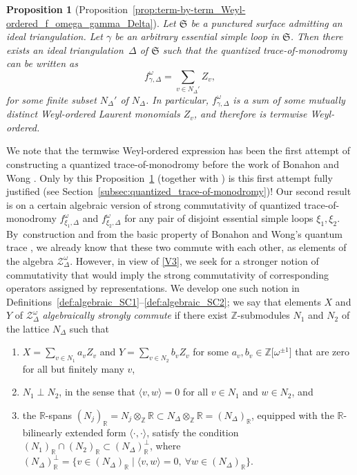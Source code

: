 \documentclass[10pt,a4paper]{amsart}
\numberwithin{equation}{section}
\newtheorem{Proposition}[Theorem]{Proposition}
\theoremstyle{definition}
\begin{document}
\begin{Proposition}[Proposition~\ref{prop:term-by-term_Weyl-ordered_f_omega_gamma_Delta}]
\label{prop:intro_term-by-term}
Let $\mathfrak{S}$ be a punctured surface admitting an ideal triangulation. Let $\gamma$ be an arbitrary essential simple loop in $\mathfrak{S}$. Then there exists an ideal triangulation~$\Delta$ of $\mathfrak{S}$ such that the quantized trace-of-monodromy can be written as
\[
f^\omega_{\gamma,\Delta} = \sum_{v\in N_\Delta'} Z_v,
\]
for some finite subset $N_\Delta'$ of $N_\Delta$. In particular, $f^\omega_{\gamma,\Delta}$ is a sum of some mutually distinct Weyl-ordered Laurent monomials $Z_v$, and therefore is termwise Weyl-ordered.
\end{Proposition}
We note that the termwise Weyl-ordered expression has been the first attempt of constructing a quantized trace-of-monodromy \cite{F97, CF2} before the work of Bonahon and Wong \cite{BW}. Only by this Proposition~\ref{prop:intro_term-by-term} (together with \cite{BW}) is this first attempt fully justified (see Section~\ref{subsec:quantized_trace-of-monodromy})!
Our second result is on a certain algebraic version of strong commutativity of quantized trace-of-monodromy $f^\omega_{\xi_1,\Delta}$ and $f^\omega_{\xi_2,\Delta}$ for any pair of disjoint essential simple loops $\xi_1,\xi_2$. By~construction and from the basic property of Bonahon and Wong's quantum trace \cite{BW}, we already know that these two commute with each other, as elements of the algebra $\mathcal{Z}^\omega_\Delta$. However, in view of \ref{V3}, we seek for a stronger notion of commutativity that would imply the strong commutativity of corresponding operators assigned by representations. We develop one such notion in Definitions~\ref{def:algebraic_SC1}--\ref{def:algebraic_SC2}; we say that elements $X$ and $Y$ of $\mathcal{Z}^\omega_\Delta$ {\em algebraically strongly commute} if there exist $\mathbb{Z}$-submodules $N_1$ and $N_2$ of the lattice $N_\Delta$ such that
\begin{enumerate}[label={\rm (\arabic*)}]\itemsep=0pt
\item $X = \sum_{v\in N_1} a_v Z_v$ and $Y = \sum_{v\in N_2} b_v Z_v$ for some $a_v,b_v \in \mathbb{Z}\bigl[\omega^{\pm 1}\bigr]$ that are zero for all but finitely many $v$,
\item $N_1 \perp N_2$, in the sense that $\langle v,w\rangle=0$ for all $v\in N_1$ and $w\in N_2$, and
\item the $\mathbb{R}$-spans $(N_j)_\mathbb{R} = N_j \otimes_\mathbb{Z} \mathbb{R} \subset N_\Delta \otimes_\mathbb{Z} \mathbb{R} = (N_\Delta)_\mathbb{R}$, equipped with the $\mathbb{R}$-bilinearly extended form $\langle \cdot,\cdot\rangle$, satisfy the condition $(N_1)_\mathbb{R} \cap (N_2)_\mathbb{R} \subset (N_\Delta)_\mathbb{R}^\perp$, where $(N_\Delta)_\mathbb{R}^\perp = \bigl\{ v\in (N_\Delta)_\mathbb{R} \mid \langle v,w\rangle=0, ~ \forall w\in (N_\Delta)_\mathbb{R}\bigr\}$.
\end{enumerate}
\end{document}
